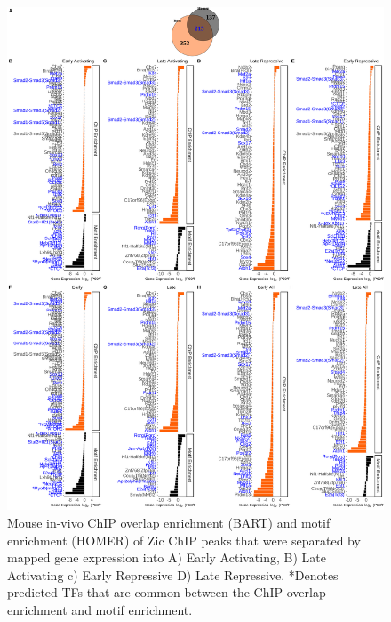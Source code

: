 \documentclass[fleqn,10pt,twocolumn]{wlscirep}
\begin{document}
\begin{figure}[ht]
\centering
\includegraphics[width=.95\textwidth]{Figures/supp_figure4.png}
\caption{Mouse in-vivo ChIP overlap enrichment (BART) and motif enrichment (HOMER) of Zic ChIP peaks that were separated by mapped gene expression into A) Early Activating, B) Late Activating c) Early Repressive D) Late Repressive. *Denotes predicted TFs that are common between the ChIP overlap enrichment and motif enrichment. }
\label{fig:HomerBart}
\end{figure}
\end{document}
